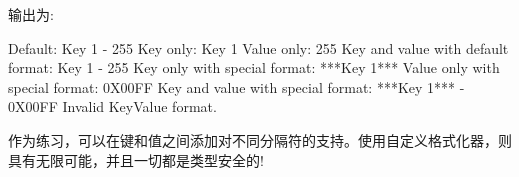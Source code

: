 输出为:

\begin{shell}
                          Default: Key 1 - 255
                         Key only: Key 1
                       Value only: 255
Key and value with default format: Key 1 - 255
     Key only with special format: ***Key 1***
   Value only with special format: 0X00FF
Key and value with special format: ***Key 1*** - 0X00FF
Invalid KeyValue format.
\end{shell}

作为练习，可以在键和值之间添加对不同分隔符的支持。使用自定义格式化器，则具有无限可能，并且一切都是类型安全的!



















